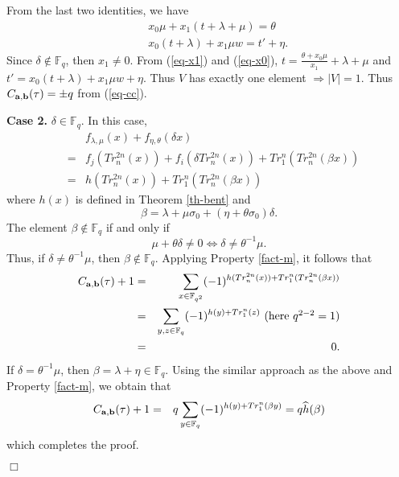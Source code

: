 \documentclass{article}
\newcommand{\F}{\ensuremath{\mathbb F}}
\newcommand{\done}{\hfill $\Box$ }
\newcommand{\abu}{{\bf{a}}}
\newcommand{\bbu}{{\bf{b}}}
\begin{document}
From the last two identities, we have
\begin{eqnarray}
&&x_0\mu+x_1(t+\lambda+\mu)=\theta \label{eq-x1}\\
 &&x_0(t+\lambda)+x_1\mu w=t'+\eta. \label{eq-x0}
\end{eqnarray} Since $\delta \notin \F_q$, then $x_1\ne 0$. From (\ref{eq-x1}) and (\ref{eq-x0}),
$t=\frac{\theta+x_0\mu}{x_1}+\lambda + \mu$ and
$t'=x_0(t+\lambda)+x_1\mu w +\eta$. Thus $V$ has exactly one
element $\Longrightarrow |V|=1$.  Thus $C_{\abu, \bbu}(\tau)=\pm q$ from (\ref{eq-cc}).

{\bf Case 2.} $\delta \in \F_q$.  In this case,  
\begin{eqnarray*}
&& f_{\lambda, \mu}(x)+f_{\eta, \theta}(\delta
x) \\
&= & f_j(Tr_n^{2n}(x))+f_i(\delta Tr_n^{2n}(x)) +Tr_1^n(Tr_n^{2n}(\beta x)) \\
& = & h(Tr_n^{2n}(x)) + Tr_1^n(Tr_n^{2n}(\beta x))
\end{eqnarray*}
where $h(x)$ is defined in Theorem \ref{th-bent} and
 \[ \beta=\lambda+\mu \sigma_0+(\eta+\theta
\sigma_0)\delta.\] 
The element $\beta\notin \F_q$ if and only if
\[
\mu + \theta  \delta \not =0 \Longleftrightarrow  \delta \not = \theta^{-1} \mu.
\]
Thus,  if   $\delta \not = \theta^{-1} \mu$,  then $\beta \notin \F_q$. Applying Property 
\ref{fact-m},  it follows that
\begin{eqnarray*}
C_{\abu, \bbu}(\tau)+1&=&\sum_{x\in \F_{q^2}}
(-1)^{h(Tr_n^{2n}(x)) +Tr_1^n(Tr_n^{2n}(\beta x))}\\
&=&\sum_{y, z \in \F_{q}} (-1)^{h(y) +Tr_1^n(z)} \,\, (\mbox{here $q^{2-2}=1$})\\
&= &0.
\end{eqnarray*}
If  $ \delta  = \theta^{-1} \mu$, then $\beta = \lambda +\eta \in \F_q$. Using the similar approach as the above and Property \ref{fact-m}, we obtain that
\begin{eqnarray*}
C_{\abu, \bbu}(\tau)+1& = &  q \sum_{y \in \F_{q}} (-1)^{h(y) +Tr_1^n(\beta y)} =q \widehat{h}(\beta)
\end{eqnarray*}
which completes the proof.

\done
\end{document}
